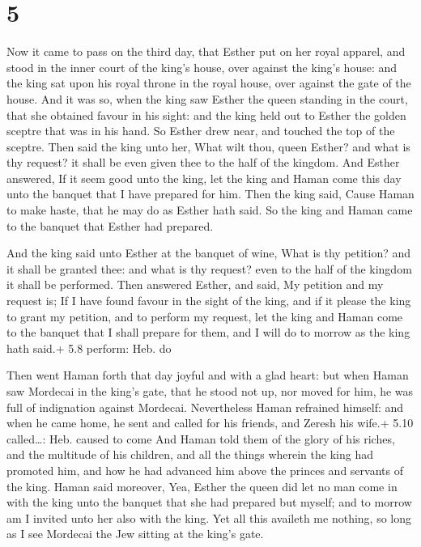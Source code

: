 \hypertarget{section-4}{%
\section{5}\label{section-4}}

 Now it came to pass on the third day, that Esther put on
her royal apparel, and stood in the inner court of the king's house,
over against the king's house: and the king sat upon his royal throne in
the royal house, over against the gate of the house.  And it
was so, when the king saw Esther the queen standing in the court, that
she obtained favour in his sight: and the king held out to Esther the
golden sceptre that was in his hand. So Esther drew near, and touched
the top of the sceptre.  Then said the king unto her, What
wilt thou, queen Esther? and what is thy request? it shall be even given
thee to the half of the kingdom.  And Esther answered, If it
seem good unto the king, let the king and Haman come this day unto the
banquet that I have prepared for him.  Then the king said,
Cause Haman to make haste, that he may do as Esther hath said. So the
king and Haman came to the banquet that Esther had prepared.

 And the king said unto Esther at the banquet of wine,
What is thy petition? and it shall be granted thee: and what is thy
request? even to the half of the kingdom it shall be performed.
 Then answered Esther, and said, My petition and my request
is;  If I have found favour in the sight of the king, and if
it please the king to grant my petition, and to perform my request, let
the king and Haman come to the banquet that I shall prepare for them,
and I will do to morrow as the king hath said.+ 5.8 perform: Heb. do

 Then went Haman forth that day joyful and with a glad
heart: but when Haman saw Mordecai in the king's gate, that he stood not
up, nor moved for him, he was full of indignation against Mordecai.
 Nevertheless Haman refrained himself: and when he came
home, he sent and called for his friends, and Zeresh his wife.+ 5.10
called\ldots: Heb. caused to come  And Haman told them of
the glory of his riches, and the multitude of his children, and all the
things wherein the king had promoted him, and how he had advanced him
above the princes and servants of the king.  Haman said
moreover, Yea, Esther the queen did let no man come in with the king
unto the banquet that she had prepared but myself; and to morrow am I
invited unto her also with the king.  Yet all this availeth
me nothing, so long as I see Mordecai the Jew sitting at the king's
gate.

